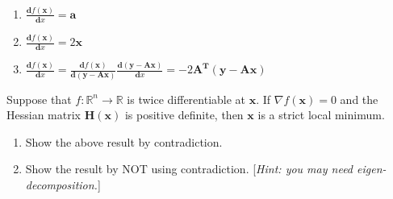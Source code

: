 \documentclass[11pt,letter,notitlepage]{article}
\begin{document}
\begin{solution}
	\heiti
	\ \\
	\begin{enumerate}
		\item $\frac{\mathbf{d}f(\mathbf{x})}{\mathbf{d}x} = \mathbf{a}$
		\item $\frac{\mathbf{d}f(\mathbf{x})}{\mathbf{d}x} = 2\mathbf{x}$
		\item $\frac{\mathbf{d}f(\mathbf{x})}{\mathbf{d}x} = \frac{\mathbf{d}f(\mathbf{x})}{\mathbf{d}(\mathbf{y} - \mathbf{A}\mathbf{x})}  \frac{\mathbf{d}(\mathbf{y} - \mathbf{A}\mathbf{x})}{\mathbf{d}x} = - 2 \mathbf{A}^\mathbf{T} (\mathbf{y} - \mathbf{A}\mathbf{x})$
	\end{enumerate}
\end{solution}
\newpage


\begin{exercise}
	Suppose that $f:\mathbb{R}^n\rightarrow\mathbb{R}$ is twice differentiable at $\mathbf{x}$. If $\nabla f(\mathbf{x})=0$ and the Hessian matrix $\mathbf{H}(\mathbf{x})$ is positive definite, then $\mathbf{x}$ is a strict local minimum.
	\begin{enumerate}
		\item Show the above result by contradiction.
		\item Show the result by NOT using contradiction. [\emph{Hint: you may need eigen-decomposition.}]
	\end{enumerate}
\end{exercise}
\end{document}
